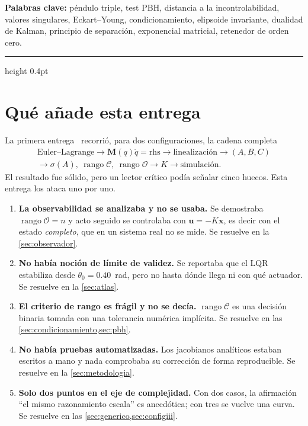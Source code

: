 \documentclass[11pt,letterpaper]{article}
\theoremstyle{definition}
\theoremstyle{plain}
\theoremstyle{remark}
\DeclareMathOperator{\rank}{rango}
\newcommand{\spec}{\sigma}
\newcommand{\calC}{\mathcal{C}}
\newcommand{\calO}{\mathcal{O}}
\newcommand{\xv}{\bm{x}}
\newcommand{\uv}{\bm{u}}
\newcommand{\Mm}{\bm{M}}
\begin{document}
\vspace{0.3em}
\noindent\textbf{Palabras clave:}\;
péndulo triple, test PBH, distancia a la incontrolabilidad, valores singulares,
Eckart--Young, condicionamiento, elipsoide invariante, dualidad de Kalman,
principio de separación, exponencial matricial, retenedor de orden cero.
\vspace{0.8em}
\hrule height 0.4pt
\vspace{1.0em}

\section{Qué añade esta entrega}
\label{sec:problema}

La primera entrega~\cite{entrega1} recorrió, para dos configuraciones, la cadena
completa
\[
\begin{gathered}
\text{Euler--Lagrange} \to \Mm(q)\ddot q=\text{rhs} \to \text{linealización} \to (A,B,C)\\
\to \spec(A),\ \rank\calC,\ \rank\calO \to K \to \text{simulación}.
\end{gathered}
\]
El resultado fue sólido, pero un lector crítico podía señalar cinco huecos. Esta
entrega los ataca uno por uno.

\begin{enumerate}
  \item \textbf{La observabilidad se analizaba y no se usaba.} Se demostraba
  $\rank\calO=n$ y acto seguido se controlaba con $\uv=-K\xv$, es decir con el
  estado \emph{completo}, que en un sistema real no se mide. Se resuelve en la
  \cref{sec:observador}.

  \item \textbf{No había noción de límite de validez.} Se reportaba que el LQR
  estabiliza desde $\theta_0=0.40$~rad, pero no hasta dónde llega ni con qué
  actuador. Se resuelve en la \cref{sec:atlas}.

  \item \textbf{El criterio de rango es frágil y no se decía.} $\rank\calC$ es
  una decisión binaria tomada con una tolerancia numérica implícita. Se resuelve
  en las \cref{sec:condicionamiento,sec:pbh}.

  \item \textbf{No había pruebas automatizadas.} Los jacobianos analíticos
  estaban escritos a mano y nada comprobaba su corrección de forma
  reproducible. Se resuelve en la \cref{sec:metodologia}.

  \item \textbf{Solo dos puntos en el eje de complejidad.} Con dos casos, la
  afirmación ``el mismo razonamiento escala'' es anecdótica; con tres se vuelve
  una curva. Se resuelve en las \cref{sec:generico,sec:configiii}.
\end{enumerate}
\end{document}
